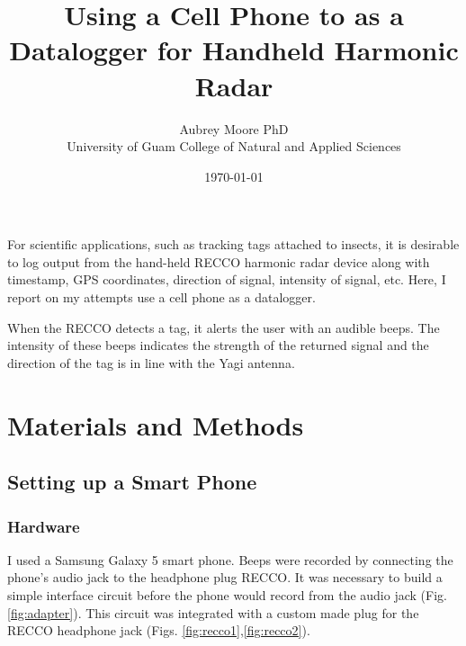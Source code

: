 \documentclass[12pt,letterpaper,english,bibliography=totocnumbered, abstract=on]{scrartcl}
\begin{document}
\titlehead{Technical Report}

\title{Using a Cell Phone to as a Datalogger for Handheld Harmonic Radar}

\author{Aubrey Moore PhD\\University of Guam College of Natural and Applied Sciences}

\date{\today}

\maketitle


\clearpage

For scientific applications, such as tracking tags attached to insects, it is desirable to log output from the hand-held RECCO harmonic radar device along with timestamp, GPS coordinates, direction of signal, intensity of signal, etc. Here, I report on my attempts use a cell phone as a datalogger.

When the RECCO detects a tag, it alerts the user with an audible beeps. The intensity of these beeps indicates the strength of the returned signal and the direction of the tag is in line with the Yagi antenna.

\section{Materials and Methods}

\subsection{Setting up a Smart Phone}


\subsubsection{Hardware}

I used a Samsung Galaxy 5 smart phone. Beeps were recorded by connecting the phone's audio jack to the headphone plug RECCO. It was necessary to build a simple interface circuit before the phone would record from the audio jack (Fig. \ref{fig:adapter}). This circuit was integrated with a custom made plug for the RECCO headphone jack (Figs. \ref{fig:recco1},\ref{fig:recco2}).
\end{document}
